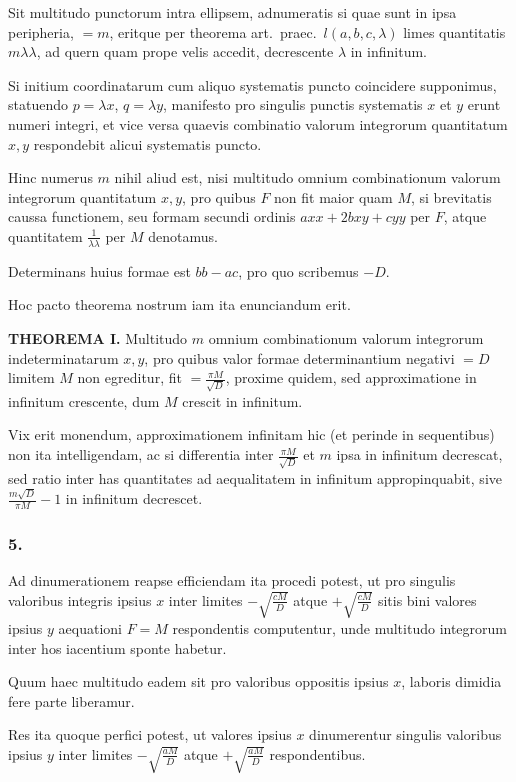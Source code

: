 \documentclass[12pt,a4paper]{article}
\begin{document}
Sit multitudo punctorum intra ellipsem, adnumeratis si quae sunt in ipsa peripheria, $=m$, eritque per theorema art.\ praec.\ $l(a,b,c,\lambda)$ limes quantitatis $m\lambda\lambda$, ad quern quam prope velis accedit, decrescente $\lambda$ in infinitum.

Si initium coordinatarum cum aliquo systematis puncto coincidere supponimus, statuendo $p=\lambda x$, $q=\lambda y$, manifesto pro singulis punctis systematis $x$ et $y$ erunt numeri integri, et vice versa quaevis combinatio valorum integrorum quantitatum $x, y$ respondebit alicui systematis puncto.

Hinc numerus $m$ nihil aliud est, nisi multitudo omnium combinationum valorum integrorum quantitatum $x, y$, pro quibus $F$ non fit maior quam $M$, si brevitatis caussa functionem, seu formam secundi ordinis $axx+2bxy+cyy$ per $F$, atque quantitatem $\frac{1}{\lambda\lambda}$ per $M$ denotamus.

Determinans huius formae est $bb-ac$, pro quo scribemus $-D$.

Hoc pacto theorema nostrum iam ita enunciandum erit.

\textbf{THEOREMA I.} Multitudo $m$ omnium combinationum valorum integrorum indeterminatarum $x, y$, pro quibus valor formae determinantium negativi $=D$ limitem $M$ non egreditur, fit $=\frac{\pi M}{\sqrt{D}}$, proxime quidem, sed approximatione in infinitum crescente, dum $M$ crescit in infinitum.

Vix erit monendum, approximationem infinitam hic (et perinde in sequentibus) non ita intelligendam, ac si differentia inter $\frac{\pi M}{\sqrt{D}}$ et $m$ ipsa in infinitum decrescat, sed ratio inter has quantitates ad aequalitatem in infinitum appropinquabit, sive $\frac{m\sqrt{D}}{\pi M}-1$ in infinitum decrescet.

\subsubsection*{5.}

Ad dinumerationem reapse efficiendam ita procedi potest, ut pro singulis valoribus integris ipsius $x$ inter limites $-\sqrt{\frac{cM}{D}}$ atque $+\sqrt{\frac{cM}{D}}$ sitis bini valores ipsius $y$ aequationi $F=M$ respondentis computentur, unde multitudo integrorum inter hos iacentium sponte habetur.

Quum haec multitudo eadem sit pro valoribus oppositis ipsius $x$, laboris dimidia fere parte liberamur.

Res ita quoque perfici potest, ut valores ipsius $x$ dinumerentur singulis valoribus ipsius $y$ inter limites $-\sqrt{\frac{aM}{D}}$ atque $+\sqrt{\frac{aM}{D}}$ respondentibus.
\end{document}
